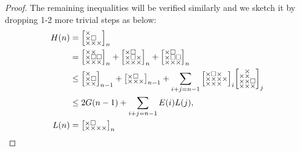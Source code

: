 \documentclass[a4paper,12pt]{article}
\makeatletter
\newenvironment{grid}
  {\begingroup\footnotesize
   \renewcommand{\arraystretch}{0}
   \setlength{\arraycolsep}{0pt}
   \left[\begin{array}{@{}*{10}{c}@{}}}
  {\end{array}\right]\endgroup}
\newcommand{\void}{\phantom{\times}}
\newcommand{\myH}{
    \begin{grid}
        \times & \void & \void \\
        \times & \square & \void \\
        \times & \times & \times
    \end{grid}
}
\newcommand{\myL}{
    \begin{grid}
        \times & \square & \void & \void \\
        \times & \times & \times & \times
    \end{grid}
}
\makeatother
\begin{document}
\begin{proof}
The remaining inequalities will be verified similarly and we sketch it by dropping 1-2 more trivial steps as below:
\begin{align*}
    H(n) &= \myH_n \\
    &= \begin{grid}
        \times & \times & \void \\
        \times & \square & \square \\
        \times & \times & \times
    \end{grid}_n + \begin{grid}
        \times & \square & \void \\
        \times & \square & \times \\
        \times & \times & \times
    \end{grid}_n + \begin{grid}
        \times & \square & \void \\
        \times & \square & \square \\
        \times & \times & \times
    \end{grid}_n\\
    &\le \begin{grid}
            \times & \void \\
            \times & \square \\
            \times & \times
        \end{grid}_{n-1} + \begin{grid}
            \times & \square & \void \\
            \times & \times & \times
        \end{grid}_{n-1} + \sum_{i+j=n-1} \begin{grid}
            \times & \square & \times & \void \\
            \times & \times & \times & \times \\
            \times & \times & \times & \void
        \end{grid}_i \begin{grid}
            \void & \times & \void \\
            \times & \times & \void \\
            \times & \times & \square \\
            \times & \times & \times
        \end{grid}_j \\
        &\le 2G(n-1) + \sum_{i+j=n-1} E(i)L(j),\\
    L(n) &= \myL_n \\

\end{align*}
\end{proof}
\end{document}
